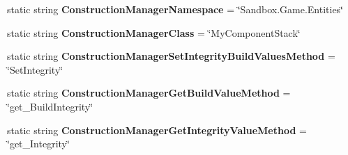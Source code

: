 \begin{DoxyCompactItemize}
\item 
\hypertarget{class_s_e_mod_a_p_i_internal_1_1_a_p_i_1_1_entity_1_1_sector_1_1_sector_object_1_1_cube_grid_1_1_cube_block_entity_a56b6ad7a063ccb3f5faa9498234619e7}{}static string {\bfseries Construction\+Manager\+Namespace} = \char`\"{}Sandbox.\+Game.\+Entities\char`\"{}\label{class_s_e_mod_a_p_i_internal_1_1_a_p_i_1_1_entity_1_1_sector_1_1_sector_object_1_1_cube_grid_1_1_cube_block_entity_a56b6ad7a063ccb3f5faa9498234619e7}

\item 
\hypertarget{class_s_e_mod_a_p_i_internal_1_1_a_p_i_1_1_entity_1_1_sector_1_1_sector_object_1_1_cube_grid_1_1_cube_block_entity_a6870cd65c0fe083a57b26e7b9339d25e}{}static string {\bfseries Construction\+Manager\+Class} = \char`\"{}My\+Component\+Stack\char`\"{}\label{class_s_e_mod_a_p_i_internal_1_1_a_p_i_1_1_entity_1_1_sector_1_1_sector_object_1_1_cube_grid_1_1_cube_block_entity_a6870cd65c0fe083a57b26e7b9339d25e}

\item 
\hypertarget{class_s_e_mod_a_p_i_internal_1_1_a_p_i_1_1_entity_1_1_sector_1_1_sector_object_1_1_cube_grid_1_1_cube_block_entity_aeb74229be5b84e82d564aa07b444ff7b}{}static string {\bfseries Construction\+Manager\+Set\+Integrity\+Build\+Values\+Method} = \char`\"{}Set\+Integrity\char`\"{}\label{class_s_e_mod_a_p_i_internal_1_1_a_p_i_1_1_entity_1_1_sector_1_1_sector_object_1_1_cube_grid_1_1_cube_block_entity_aeb74229be5b84e82d564aa07b444ff7b}

\item 
\hypertarget{class_s_e_mod_a_p_i_internal_1_1_a_p_i_1_1_entity_1_1_sector_1_1_sector_object_1_1_cube_grid_1_1_cube_block_entity_a0971f15843f5e0278b91dae9ba0477e9}{}static string {\bfseries Construction\+Manager\+Get\+Build\+Value\+Method} = \char`\"{}get\+\_\+\+Build\+Integrity\char`\"{}\label{class_s_e_mod_a_p_i_internal_1_1_a_p_i_1_1_entity_1_1_sector_1_1_sector_object_1_1_cube_grid_1_1_cube_block_entity_a0971f15843f5e0278b91dae9ba0477e9}

\item 
\hypertarget{class_s_e_mod_a_p_i_internal_1_1_a_p_i_1_1_entity_1_1_sector_1_1_sector_object_1_1_cube_grid_1_1_cube_block_entity_aae6f63f585fb860cfb1430e3cba3f825}{}static string {\bfseries Construction\+Manager\+Get\+Integrity\+Value\+Method} = \char`\"{}get\+\_\+\+Integrity\char`\"{}\label{class_s_e_mod_a_p_i_internal_1_1_a_p_i_1_1_entity_1_1_sector_1_1_sector_object_1_1_cube_grid_1_1_cube_block_entity_aae6f63f585fb860cfb1430e3cba3f825}


\end{DoxyCompactItemize}
